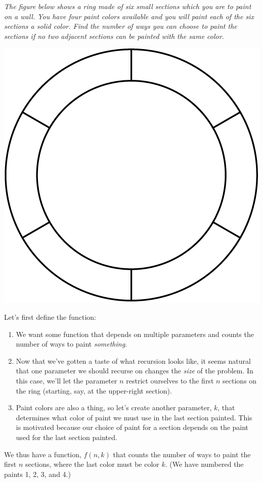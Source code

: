 \documentclass{article}
\begin{document}
\textit{The figure below shows a ring made of six small sections which you are to paint on a wall. You have four paint colors available and you will paint each of the six sections a solid color. Find the number of ways you can choose to paint the sections if no two adjacent sections can be painted with the same color.}
\begin{center}
\includegraphics[scale=0.35]{images/2016_aime_ii_p12.png}
\end{center}

Let's first define the function:
\begin{enumerate}
    \item We want some function that depends on multiple parameters and counts the number of ways to paint \textit{something}.
    \item Now that we've gotten a taste of what recursion looks like, it seems natural that one parameter we should recurse on changes the \textit{size} of the problem. In this case, we'll let the parameter $n$ restrict ourselves to the first $n$ sections on the ring (starting, say, at the upper-right section).
    \item Paint colors are also a thing, so let's create another parameter, $k$, that determines what color of paint we must use in the last section painted. This is motivated because our choice of paint for a section depends on the paint used for the last section painted.
\end{enumerate}
We thus have a function, $f(n, k)$ that counts the number of ways to paint the first $n$ sections, where the last color must be color $k$. (We have numbered the paints 1, 2, 3, and 4.)
\end{document}
